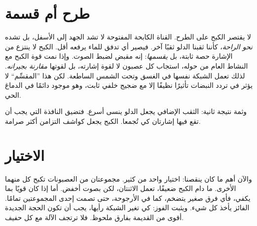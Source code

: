 \section*{طرح أم قسمة}

لا يقتصر الكبح على الطرح. القناة الكابحة المفتوحة لا تشد الجهد إلى الأسفل، بل تشده \emph{نحو الراحة}، كأننا ثقبنا الدلو ثقبًا آخر. فيصير أي تدفق للماء يرفعه أقل. الكبح لا ينتزع من الإشارة حصة ثابتة، بل \emph{يقسمها}: إنه مقبض لضبط الصوت. وإذا نمت قوة الكبح مع النشاط العام من حوله، استجاب كل عصبون لا لقوة إشارته، بل لقوتها \emph{مقارنة بجيرانه}. لذلك تعمل الشبكة نفسها في الغسق وتحت الشمس الساطعة. لكن هذا ”المقسِّم“ لا يؤثر في تردد النبضات تأثيرًا نظيفًا إلا مع ضجيج خلفي ثابت، وهو موجود دائمًا في الدماغ الحي.


وثمة نتيجة ثانية: الثقب الإضافي يجعل الدلو ينسى أسرع. فتضيق النافذة التي يجب أن تقع فيها إشارتان كي تُجمعا. الكبح يجعل كواشف التزامن أكثر صرامة.

\section*{الاختيار}

والآن أهم ما كان ينقصنا: اختيار واحد من كثير. مجموعتان من العصبونات تكبح كل منهما الأخرى. ما دام الكبح ضعيفًا، تعمل الاثنتان، لكن بصوت أخفض. أما إذا كان قويًا بما يكفي، فأي فرق صغير يتضخم، كما في الأرجوحة، حتى تصمت إحدى المجموعتين تمامًا. الفائز يأخذ كل شيء. ويثبت الفوز: كي تغير الشبكة رأيها، يجب أن تكون الحجة الجديدة أقوى من القديمة بفارق ملحوظ. فلا ترتجف الآلة مع كل حفيف.

